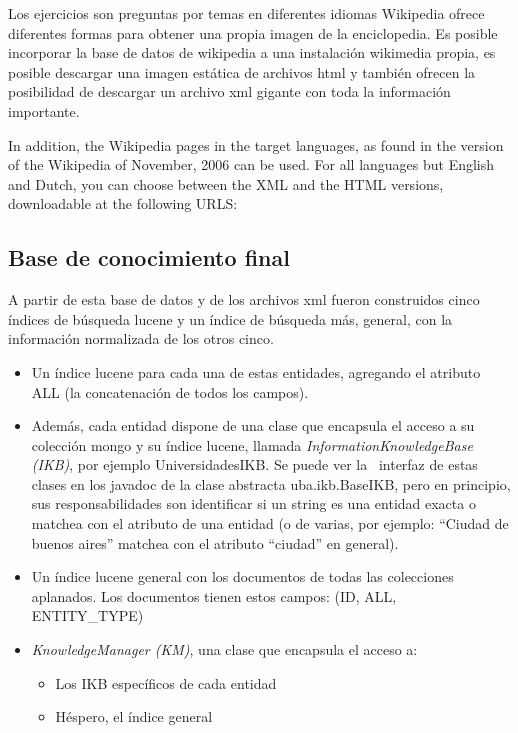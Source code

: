 Los ejercicios son preguntas por temas en diferentes idiomas
Wikipedia ofrece diferentes formas para obtener una propia imagen de la enciclopedia.
Es posible incorporar la base de datos de wikipedia a una instalación wikimedia
propia, es posible descargar una imagen estática de archivos html y también ofrecen
la posibilidad de descargar un archivo xml gigante con toda la información importante.


In addition, the Wikipedia pages in the target languages, as found in the version
of the Wikipedia of November, 2006 can be used. For all languages but English and
Dutch, you can choose between the XML and the HTML versions, downloadable at
the following URLS:

\subsection{Base de conocimiento final}

A partir de esta base de datos y de los archivos xml fueron construidos cinco \'indices
de b\'usqueda lucene y un \'indice de b\'usqueda m\'as, general, con la
informaci\'on normalizada de los otros cinco. 


\begin{itemize}
\item Un \'indice lucene para cada una de estas entidades, agregando el
atributo ALL (la concatenaci\'on de todos los campos).
\item Adem\'as, cada entidad dispone de una clase que encapsula el
acceso a su colecci\'on mongo y su \'indice lucene, llamada
\textit{InformationKnowledgeBase} \textit{(IKB)}, por ejemplo
UniversidadesIKB. Se puede ver la \ interfaz de estas clases en los
javadoc de la clase abstracta uba.ikb.BaseIKB, pero en principio, sus
responsabilidades son identificar si un string es una entidad exacta o
matchea con el atributo de una entidad (o de varias, por ejemplo:
{\textquotedblleft}Ciudad de buenos aires{\textquotedblright} matchea
con el atributo {\textquotedblleft}ciudad{\textquotedblright} en
general).
\item Un \'indice lucene general con los documentos de todas las
colecciones aplanados. Los documentos tienen estos campos: (ID, ALL,
ENTITY\_TYPE)
\item \textit{KnowledgeManager (KM)},\textit{ }una clase que encapsula
el acceso a:

\begin{itemize}
\item Los IKB espec\'ificos de cada entidad
\item H\'espero, el \'indice general
\end{itemize}
\end{itemize}

